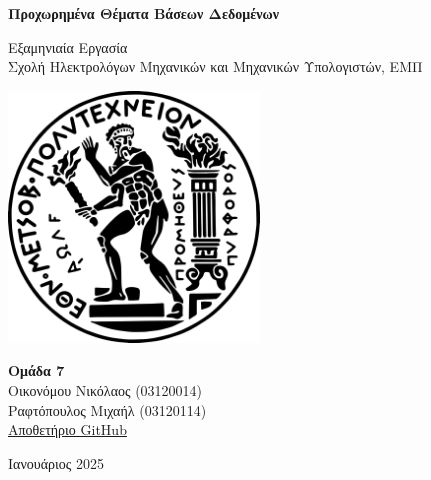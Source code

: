 \documentclass[a4paper,12pt]{article}
\begin{document}
\begin{otherlanguage}{greek}

\begin{titlepage}
    	\centering
    	\vspace*{2cm}

    	\Huge
    	\textbf{Προχωρημένα Θέματα Βάσεων Δεδομένων}

    	\vspace{0.5cm}
    	\LARGE
    	Εξαμηνιαία Εργασία \\
	\Large
    	Σχολή Ηλεκτρολόγων Μηχανικών και Μηχανικών Υπολογιστών, ΕΜΠ

    	\vspace{1.5cm}
    	\includegraphics[width=0.5\textwidth]{ntua.png}

    	\vfill

   	\Large
	\textbf{Ομάδα 7} \\
	Οικονόμου Νικόλαος (03120014) \\
	Ραφτόπουλος Μιχαήλ (03120114) \\
	\vspace{.2cm}
	\large
	\href{https://github.com/ntua-el20114/Advanced-Databases}{Αποθετήριο GitHub}\\

	\vfill

	\normalsize
    	Ιανουάριος 2025

    	\vspace{0.8cm}
\end{titlepage}

\newpage

\tableofcontents
\newpage



\end{otherlanguage}
\end{document}

